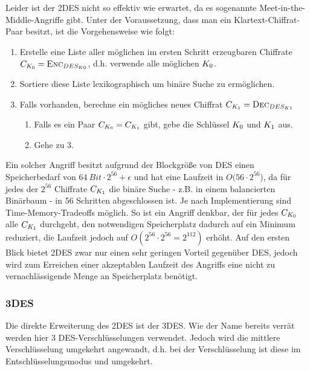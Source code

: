 Leider ist der 2DES nicht so effektiv wie erwartet, da es sogenannte Meet-in-the-Middle-Angriffe gibt. Unter der Voraussetzung, dass man ein
Klartext-Chiffrat-Paar besitzt, ist die Vorgehensweise wie folgt:
\begin{enumerate}
	\item Erstelle eine Liste aller möglichen im ersten Schritt erzeugbaren Chiffrate $C_{K_0} = \textsc{Enc}_{DES_{K 0}}$, d.h. verwende alle möglichen
	$K_0$.
	\item Sortiere diese Liste lexikographisch um binäre Suche zu ermöglichen.
	\item Falls vorhanden, berechne ein mögliches neues Chiffrat $C_{K_1}= \textsc{Dec}_{DES_{K 1}}$
	\begin{enumerate}
		\item Falls es ein Paar $C_{K_0} = C_{K_1}$ gibt, gebe die Schlüssel $K_0$ und $K_1$ aus.
		\item Gehe zu 3.
	\end{enumerate}
\end{enumerate}
Ein solcher Angriff besitzt aufgrund der Blockgröße von DES einen Speicherbedarf von $64\ Bit \cdot 2^{56} + \epsilon$ und hat eine Laufzeit in $O(56 \cdot 2^{56}$), da für jedes der $2^{56}$ Chiffrate $C_{K_1}$ die binäre Suche - z.B. in einem balancierten Binärbaum - in 56 Schritten abgeschlossen ist. Je nach Implementierung sind Time-Memory-Tradeoffs möglich. So ist ein Angriff denkbar, der für jedes $C_{K_0}$ alle $C_{K_1}$ durchgeht, den notwendigen Speicherplatz dadurch auf ein Minimum reduziert, die Laufzeit jedoch auf $O(2^{56} \cdot 2^{56} = 2^{112})$ erhöht. Auf den ersten Blick bietet 2DES zwar nur einen sehr geringen Vorteil gegenüber DES, jedoch wird zum Erreichen einer akzeptablen Laufzeit des Angriffs eine nicht zu vernachlässigende Menge an Speicherplatz benötigt.

\subsubsection{3DES}
\label{sssec:3des}
Die direkte Erweiterung des 2DES ist der 3DES. Wie der Name bereits verrät werden hier 3 DES-Verschlüsselungen verwendet. Jedoch wird die mittlere Verschlüsselung umgekehrt angewandt, d.h. bei der Verschlüsselung ist diese im Entschlüsselungsmodus und umgekehrt.

